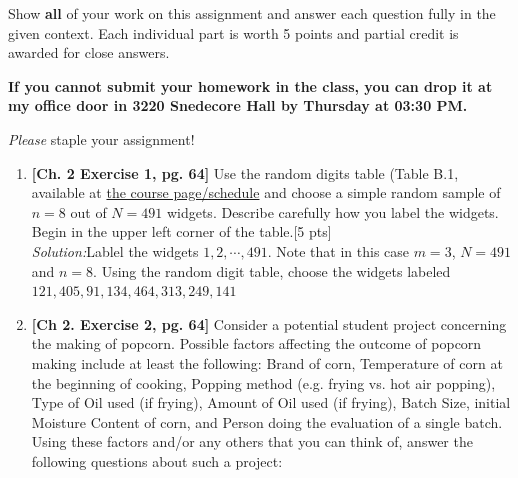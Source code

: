 \documentclass[11pt]{article}\usepackage[]{graphicx}\usepackage[]{color}
\begin{document}

\pagestyle{fancy} 

Show \textbf{all} of your work on this assignment and answer each question fully in the given context. 
Each individual part is worth 5 points and partial credit is awarded for close answers.
\vspace{0.3cm}

\textbf{If you cannot submit your homework in the class, you can drop it at my office door in 3220 Snedecore Hall by Thursday at 03:30 PM.}

\vspace{0.3cm}
\emph{Please} staple your assignment!

\begin{enumerate}

\item \textbf{[Ch. 2 Exercise 1, pg. 64]} Use the random digits table (Table B.1, available at \href{https://ashirazist.github.io/stat305_s2020.github.io/schedule.html}{the course page/schedule} and choose a simple random sample of $n = 8$ out of $N = 491$ widgets. Describe carefully how you label the widgets. Begin in the upper left corner of the table.[5 pts] \\

\emph{Solution:}Lablel the widgets $1, 2, \cdots, 491$. Note that in this case $m=3$, $N=491$ and $n=8$. Using the random digit table,  choose the widgets labeled $121, 405, 91, 134, 464, 313, 249, 141$\\


\item \textbf{[Ch 2. Exercise 2, pg. 64]} Consider a potential student project concerning the making of popcorn. Possible factors affecting the outcome of popcorn making include at least the following: Brand of corn, Temperature of corn at the beginning of cooking, Popping method (e.g. frying vs. hot air popping), Type of Oil used (if frying), Amount of Oil used (if frying), Batch Size, initial Moisture Content of corn, and Person doing the evaluation of a single batch. Using these factors and/or any others that you can think of, answer the following questions about such a project:


\end{enumerate}
\end{document}
